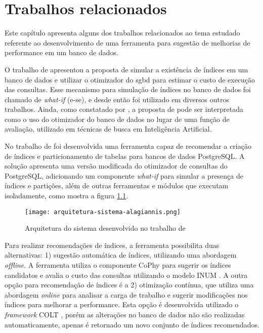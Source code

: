 \chapter{Trabalhos relacionados}
\label{trabalhos-relacionados}

Este capítulo apresenta alguns dos trabalhos relacionados ao tema estudado referente ao desenvolvimento de uma ferramenta para sugestão de melhorias de performance em um banco de dados.

O trabalho de \textbf{} apresentou a proposta de simular a existência de índices em um banco de dados e utilizar o otimizador do \gls{sgbd} para estimar o custo de execução das consultas. Esse mecanismo para simulação de índices no banco de dados foi chamado de \emph{what-if} (e-se), e desde então foi utilizado em diversos outros trabalhos. Ainda, como constatado por , a proposta de  pode ser interpretada como o uso do otimizador do banco de dados no lugar de uma função de avaliação, utilizado em técnicas de busca em Inteligência Artificial.

No trabalho de \textbf{\citet{Alagiannis:2010}} foi desenvolvida uma ferramenta capaz de recomendar a criação de índices e particionamento de tabelas para bancos de dados PostgreSQL. A solução apresenta uma versão modificada do otimizador de consultas do PostgreSQL, adicionando um componente \emph{what-if} para simular a presença de índices e partições, além de outras ferramentas e módulos que executam isoladamente, como mostra a figura \ref{fig:arquitetura-sistema-alagiannis}.

\begin{figure}[ht]
  \centering
  \caption{Arquitetura do sistema desenvolvido no trabalho de }
  \texttt{[image: arquitetura-sistema-alagiannis.png]}
  \label{fig:arquitetura-sistema-alagiannis}
\end{figure}

Para realizar recomendações de índices, a ferramenta possibilita duas alternativas: 1) sugestão automática de índices, utilizando uma abordagem \emph{offline}. A ferramenta utiliza o componente CoPhy \cite{Dash:2011} para sugerir os índices candidatos e avalia o custo das consultas utilizando o modelo INUM \cite{Papadomanolakis:2007}. A outra opção para recomendação de índices é a 2) otimização contínua, que utiliza uma abordagem \emph{online} para analisar a carga de trabalho e sugerir modificações nos índices para melhorar a performance. Esta opção é desenvolvida utilizado o \emph{framework} COLT \cite{Schnaitter:2006}, porém as alterações no banco de dados não são realizadas automaticamente, apenas é retornado um novo conjunto de índices recomendados.

